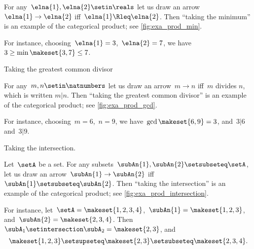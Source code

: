 \begin{example}
    \label{exa:min-as-prod}
    For any~$\elna{1},\elna{2}\setin \reals$ let us draw an arrow~$\elna{1}\to \elna{2}$ iff~$\elna{1}\Rleq \elna{2}$.
    Then ``taking the minimum'' is an example of the categorical product; see \cref{fig:exa_prod_min}.

    For instance, choosing~$\elna{1} = 3$,~$\elna{2} = 7$, we have~$3 \geq \min \makeset{3, 7} \leq 7$.
\end{example}

\begin{marginfigure}
    \centering
    \caption{Taking the greatest common divisor}
    \label{fig:exa_prod_gcd}
\end{marginfigure}

\begin{example}
    \label{exa:gcd-as-prod}
    For any~$m, n \setin \natnumbers$ let us draw an arrow~$m \to n$ iff~$m$ divides $n$, which is written $m | n$.
    Then ``taking the greatest common divisor'' is an example of the categorical product; see \cref{fig:exa_prod_gcd}.

    For instance, choosing~$m = 6$,~$n = 9$, we have~$\gcd \makeset{6, 9 } = 3$, and~$3 | 6$ and~$3 | 9$.
\end{example}

\begin{marginfigure}
    \centering
    \caption{Taking the intersection.}
    \label{fig:exa_prod_intersection}
\end{marginfigure}

\begin{example}
    \label{exa:intersection-as-prod}
    Let~$\setA$ be a set.
    For any subsets~$\subAn{1}, \subAn{2} \setsubseteq \setA$, let us draw an arrow~$\subAn{1} \to \subAn{2}$ iff~$\subAn{1} \setsubseteq \subAn{2}$.
    Then ``taking the intersection'' is an example of the categorical product; see \cref{fig:exa_prod_intersection}.

    For instance, let~$\setA = \makeset{ 1, 2, 3, 4 }$,~$\subAn{1} = \makeset{ 1, 2, 3 }$, and~$\subAn{2} = \makeset{2, 3, 4 }$.
    Then~$\subA_1 \setintersection \subA_2 = \makeset{2, 3 }$, and
    \begin{equation}
        \makeset{ 1, 2, 3 } \setsupseteq \makeset{2, 3 } \setsubseteq \makeset{2, 3, 4 }.
    \end{equation}
\end{example}

